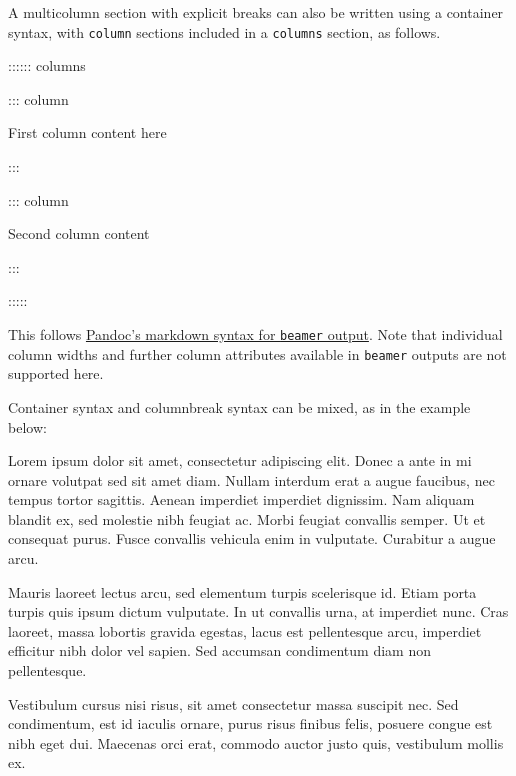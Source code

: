 \documentclass[
]{article}
\newenvironment{Shaded}{}{}
\newcommand{\NormalTok}[1]{#1}
\begin{document}
A multicolumn section with explicit breaks can also be written using a
container syntax, with \texttt{column} sections included in a
\texttt{columns} section, as follows.

\begin{Shaded}
\begin{Highlighting}[]
\NormalTok{:::::: columns}

\NormalTok{::: column}

\NormalTok{First column content here}

\NormalTok{:::}

\NormalTok{::: column}

\NormalTok{Second column content}

\NormalTok{:::}

\NormalTok{:::::}
\end{Highlighting}
\end{Shaded}

This follows \href{https://pandoc.org/MANUAL.html\#columns}{Pandoc's
markdown syntax for \texttt{beamer} output}. Note that individual column
widths and further column attributes available in \texttt{beamer}
outputs are not supported here.

Container syntax and columnbreak syntax can be mixed, as in the example
below:

{\begin{multicols}{3}

Lorem ipsum dolor sit amet, consectetur adipiscing elit. Donec a ante in
mi ornare volutpat sed sit amet diam. Nullam interdum erat a augue
faucibus, nec tempus tortor sagittis. Aenean imperdiet imperdiet
dignissim. Nam aliquam blandit ex, sed molestie nibh feugiat ac. Morbi
feugiat convallis semper. Ut et consequat purus. Fusce convallis
vehicula enim in vulputate. Curabitur a augue arcu.

\columnbreak

Mauris laoreet lectus arcu, sed elementum turpis scelerisque id. Etiam
porta turpis quis ipsum dictum vulputate. In ut convallis urna, at
imperdiet nunc. Cras laoreet, massa lobortis gravida egestas, lacus est
pellentesque arcu, imperdiet efficitur nibh dolor vel sapien. Sed
accumsan condimentum diam non pellentesque.

\columnbreak

Vestibulum cursus nisi risus, sit amet consectetur massa suscipit nec.
Sed condimentum, est id iaculis ornare, purus risus finibus felis,
posuere congue est nibh eget dui. Maecenas orci erat, commodo auctor
justo quis, vestibulum mollis ex.

\end{multicols}
}
\end{document}
